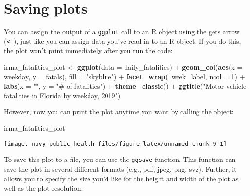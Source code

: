 \documentclass[]{tufte-book}
\newenvironment{Shaded}{}{}
\newcommand{\DataTypeTok}[1]{\textcolor[rgb]{0.56,0.13,0.00}{#1}}
\newcommand{\DecValTok}[1]{\textcolor[rgb]{0.25,0.63,0.44}{#1}}
\newcommand{\KeywordTok}[1]{\textcolor[rgb]{0.00,0.44,0.13}{\textbf{#1}}}
\newcommand{\NormalTok}[1]{#1}
\newcommand{\OperatorTok}[1]{\textcolor[rgb]{0.40,0.40,0.40}{#1}}
\newcommand{\StringTok}[1]{\textcolor[rgb]{0.25,0.44,0.63}{#1}}
\begin{document}
\hypertarget{saving-plots}{%
\section{Saving plots}\label{saving-plots}}

You can assign the output of a \texttt{ggplot} call to an R object using the gets arrow
(\texttt{\textless{}-}), just like you can assign data you've read in to an R object. If you do this,
the plot won't print immediately after you run the code:

\begin{Shaded}
\begin{Highlighting}[]
\NormalTok{irma_fatalities_plot <-}\StringTok{ }\KeywordTok{ggplot}\NormalTok{(}\DataTypeTok{data =}\NormalTok{ daily_fatalities) }\OperatorTok{+}\StringTok{ }
\StringTok{    }\KeywordTok{geom_col}\NormalTok{(}\KeywordTok{aes}\NormalTok{(}\DataTypeTok{x =}\NormalTok{ weekday, }\DataTypeTok{y =}\NormalTok{ fatals), }\DataTypeTok{fill =} \StringTok{"skyblue"}\NormalTok{) }\OperatorTok{+}\StringTok{ }
\StringTok{    }\KeywordTok{facet_wrap}\NormalTok{(}\OperatorTok{~}\NormalTok{week_label, }\DataTypeTok{ncol =} \DecValTok{1}\NormalTok{) }\OperatorTok{+}\StringTok{ }\KeywordTok{labs}\NormalTok{(}\DataTypeTok{x =} \StringTok{""}\NormalTok{, }
    \DataTypeTok{y =} \StringTok{"# of fatalities"}\NormalTok{) }\OperatorTok{+}\StringTok{ }\KeywordTok{theme_classic}\NormalTok{() }\OperatorTok{+}\StringTok{ }
\StringTok{    }\KeywordTok{ggtitle}\NormalTok{(}\StringTok{"Motor vehicle fatalities in Florida by weekday, 2019"}\NormalTok{)}
\end{Highlighting}
\end{Shaded}

However, now you can print the plot anytime you want by calling the object:

\begin{Shaded}
\begin{Highlighting}[]
\NormalTok{irma_fatalities_plot}
\end{Highlighting}
\end{Shaded}

\texttt{[image: navy\_public\_health\_files/figure-latex/unnamed-chunk-9-1]}

To save this plot to a file, you can use the \texttt{ggsave} function. This function can save
the plot in several different formats (e.g., pdf, jpeg, png, svg). Further, it allows you
to specify the size you'd like for the height and width of the plot as well as the plot
resolution.
\end{document}
